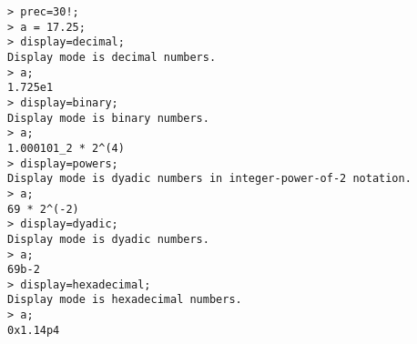 \begin{center}\begin{minipage}{15cm}\begin{Verbatim}[frame=single]
> prec=30!;
> a = 17.25;
> display=decimal;
Display mode is decimal numbers.
> a;
1.725e1
> display=binary;
Display mode is binary numbers.
> a;
1.000101_2 * 2^(4)
> display=powers;
Display mode is dyadic numbers in integer-power-of-2 notation.
> a;
69 * 2^(-2)
> display=dyadic;
Display mode is dyadic numbers.
> a;
69b-2
> display=hexadecimal;
Display mode is hexadecimal numbers.
> a;
0x1.14p4
\end{Verbatim}
\end{minipage}\end{center}
